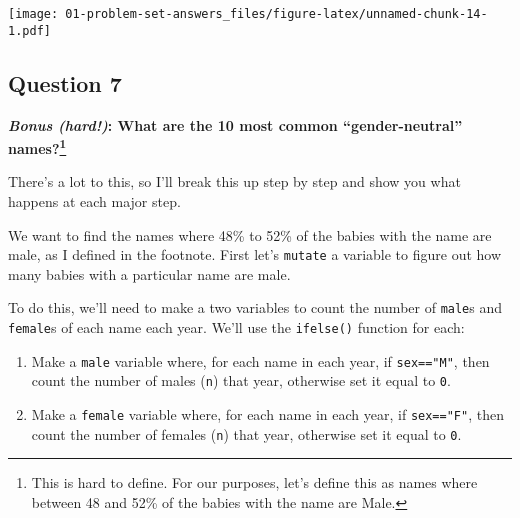 \documentclass[
]{article}
\newenvironment{Shaded}{\begin{snugshade}}{\end{snugshade}}
\newcommand{\DataTypeTok}[1]{\textcolor[rgb]{0.13,0.29,0.53}{#1}}
\newcommand{\DecValTok}[1]{\textcolor[rgb]{0.00,0.00,0.81}{#1}}
\newcommand{\KeywordTok}[1]{\textcolor[rgb]{0.13,0.29,0.53}{\textbf{#1}}}
\newcommand{\NormalTok}[1]{#1}
\newcommand{\OperatorTok}[1]{\textcolor[rgb]{0.81,0.36,0.00}{\textbf{#1}}}
\newcommand{\StringTok}[1]{\textcolor[rgb]{0.31,0.60,0.02}{#1}}
\providecommand{\tightlist}{%
  \setlength{\itemsep}{0pt}\setlength{\parskip}{0pt}}
\begin{document}
\texttt{[image: 01-problem-set-answers\_files/figure-latex/unnamed-chunk-14-1.pdf]}

\hypertarget{question-7}{%
\subsection{Question 7}\label{question-7}}

\textbf{\emph{Bonus (hard!)}: What are the 10 most common
``gender-neutral'' names?\footnote{This is hard to define. For our
  purposes, let's define this as names where between 48 and 52\% of the
  babies with the name are Male.}}

There's a lot to this, so I'll break this up step by step and show you
what happens at each major step.

We want to find the names where 48\% to 52\% of the babies with the name
are male, as I defined in the footnote. First let's \texttt{mutate} a
variable to figure out how many babies with a particular name are male.

To do this, we'll need to make a two variables to count the number of
\texttt{male}s and \texttt{female}s of each name each year. We'll use
the \texttt{ifelse()} function for each:

\begin{enumerate}
\def\labelenumi{\arabic{enumi}.}
\tightlist
\item
  Make a \texttt{male} variable where, for each name in each year, if
  \texttt{sex=="M"}, then count the number of males (\texttt{n}) that
  year, otherwise set it equal to \texttt{0}.
\item
  Make a \texttt{female} variable where, for each name in each year, if
  \texttt{sex=="F"}, then count the number of females (\texttt{n}) that
  year, otherwise set it equal to \texttt{0}.
\end{enumerate}

\begin{Shaded}
\end{Shaded}
\end{document}
